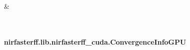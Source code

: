 \documentclass[letterpaper,10pt,english]{sphinxmanual}
\begin{document}
\begin{savenotes}\sphinxattablestart
\sphinxthistablewithglobalstyle
\sphinxthistablewithnovlinesstyle
\centering
\begin{tabulary}{\linewidth}[t]{}
\sphinxtoprule
\sphinxtableatstartofbodyhook
\sphinxAtStartPar
{\hyperref[\detokenize{_autosummary/nirfasterff.lib.nirfasterff_cuda.ConvergenceInfoGPU:nirfasterff.lib.nirfasterff_cuda.ConvergenceInfoGPU}]{}}
&
\sphinxAtStartPar

\\
\sphinxbottomrule
\end{tabulary}
\sphinxtableafterendhook\par
\sphinxattableend\end{savenotes}

\sphinxstepscope


\paragraph{nirfasterff.lib.nirfasterff\_cuda.ConvergenceInfoGPU}
\label{\detokenize{_autosummary/nirfasterff.lib.nirfasterff_cuda.ConvergenceInfoGPU:nirfasterff-lib-nirfasterff-cuda-convergenceinfogpu}}\label{\detokenize{_autosummary/nirfasterff.lib.nirfasterff_cuda.ConvergenceInfoGPU::doc}}
\end{document}
